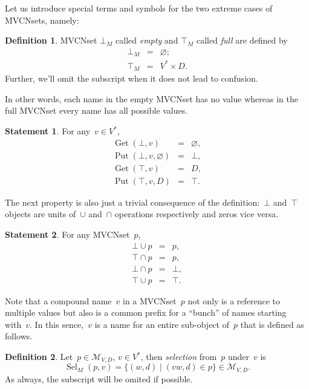 \documentclass{article}
\theoremstyle{definition}
\newtheorem{Df}{Definition}
\newtheorem{St}{Statement}
\newcommand{\setcharmvcn}{M}
\newcommand{\setsymbol}[3]{\mathcal{#1}_{#2,#3}}
\newcommand{\setmvcn}[2]{\setsymbol{\setcharmvcn}{#1}{#2}}
\newcommand{\select}{\operatorname{Sel}}
\newcommand{\deref}{\operatorname{Get}}
\newcommand{\putval}{\operatorname{Put}}
\begin{document}
Let us introduce special terms and symbols for the two extreme cases of
MVCNsets, namely:
\begin{Df}\label{df:mvcn-extreme}
MVCNset $\bot_\setcharmvcn$ called \emph{empty} and $\top_\setcharmvcn$ called
\emph{full} are defined by
\begin{eqnarray*}
  \bot_\setcharmvcn &  = &  \varnothing ; \\
  \top_\setcharmvcn &  = &  V^\ast \times D .
\end{eqnarray*}
Further, we'll omit the subscript when it does not lead to confusion.
\end{Df}

In other words, each name in the empty MVCNset has no value whereas in the
full MVCNset every name has all possible values.
\begin{St}\label{st:mvcn-extreme-deref}
For any~$v\in V^\ast$,
\begin{eqnarray*}
  \deref(\bot, v) & = & \varnothing, \\
  \putval(\bot, v, \varnothing) & = & \bot , \\
  \deref(\top, v) & = & D , \\
  \putval(\top, v, D) & = & \top .
\end{eqnarray*}
\end{St}

The next property is also just a trivial consequence of the definition:~$\bot$
and~$\top$ objects are units of~$\cup$ and~$\cap$ operations respectively and
zeros vice versa.
\begin{St}\label{st:mvcn-neutrals}
For any MVCNset~$p$,
\begin{eqnarray*}
  \bot \cup p & = & p,    \\
  \top \cap p & = & p,    \\
  \bot \cap p & = & \bot, \\
  \top \cup p & = & \top.
\end{eqnarray*}
\end{St}

Note that a compound name~$v$ in a MVCNset~$p$ not only is a reference to
multiple values but also is a common prefix for a ``bunch'' of names starting
with~$v$. In this sence,~$v$ is a name for an entire sub-object of~$p$ that is
defined as follows.
\begin{Df}\label{df:mvcn-select}
Let~$p\in\setmvcn{V}{D}$, $v\in V^\ast$, then \emph{selection} from~$p$
under~$v$ is
\[
  \select_\setcharmvcn(p,v) = \{ (w, d) \mid (vw, d)\in p \} \in\setmvcn{V}{D}.
\]
As always, the subscript will be omited if possible.
\end{Df}
\end{document}
